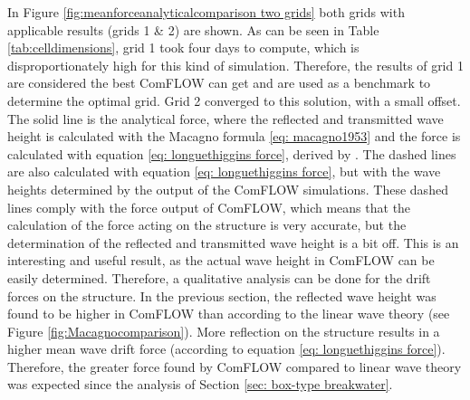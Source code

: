 In Figure \ref{fig:meanforceanalyticalcomparison two grids} both grids with applicable results (grids 1 \& 2) are shown. As can be seen in Table \ref{tab:celldimensions}, grid 1 took four days to compute, which is disproportionately high for this kind of simulation. Therefore, the results of grid 1 are considered the best ComFLOW can get and are used as a benchmark to determine the optimal grid. Grid 2 converged to this solution, with a small offset. The solid line is the analytical force, where the reflected and transmitted wave height is calculated with the Macagno formula \ref{eq: macagno1953} \parencite{macagno1953fluid} and the force is calculated with equation \ref{eq: longuethiggins force}, derived by \citet{longuethiggins1977}. The dashed lines are also calculated with equation \ref{eq: longuethiggins force}, but with the wave heights determined by the output of the ComFLOW simulations. These dashed lines comply with the force output of ComFLOW, which means that the calculation of the force acting on the structure is very accurate, but the determination of the reflected and transmitted wave height is a bit off. This is an interesting and useful result, as the actual wave height in ComFLOW can be easily determined. Therefore, a qualitative analysis can be done for the drift forces on the structure. In the previous section, the reflected wave height was found to be higher in ComFLOW than according to the linear wave theory (see Figure \ref{fig:Macagnocomparison}). More reflection on the structure results in a higher mean wave drift force (according to equation \ref{eq: longuethiggins force}). Therefore, the greater force found by ComFLOW compared to linear wave theory was expected since the analysis of Section \ref{sec: box-type breakwater}.




